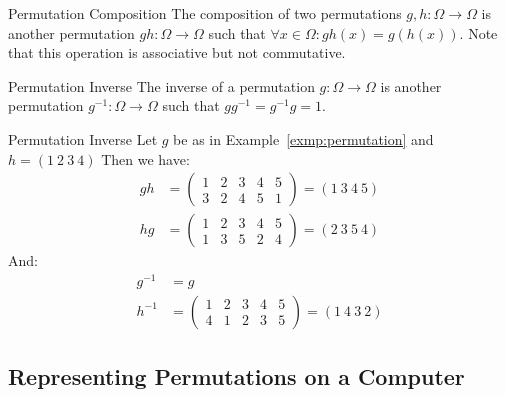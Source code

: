 \begin{defn}{Permutation Composition}
  The composition of two permutations $g, h: \Omega \rightarrow \Omega$ is
  another permutation $gh: \Omega \rightarrow \Omega$ such that $\forall x \in
  \Omega: gh(x) = g(h(x))$. Note that this operation is associative but not
  commutative.
\end{defn}

\begin{defn}[label=defn:permutation_inverse]{Permutation Inverse}
  The inverse of a permutation $g: \Omega \rightarrow \Omega$ is another
  permutation $g^{-1}: \Omega \rightarrow \Omega$ such that $gg^{-1} = g^{-1}g =
  1$.
\end{defn}

\begin{exmp}{Permutation Inverse}
  Let $g$ be as in Example~\ref{exmp:permutation} and $h = (1\ 2\ 3\ 4)$ Then
  we have:
  \begin{equation*}
    \begin{split}
      gh &= \begin{pmatrix} 1 & 2 & 3 & 4 & 5 \\ 3 & 2 & 4 & 5 & 1 \end{pmatrix}
        = (1\ 3\ 4\ 5) \\
      hg &= \begin{pmatrix} 1 & 2 & 3 & 4 & 5 \\ 1 & 3 & 5 & 2 & 4 \end{pmatrix}
        = (2\ 3\ 5\ 4)
    \end{split}
  \end{equation*}
  And:
  \begin{equation*}
    \begin{split}
      g^{-1} &= g \\
      h^{-1} &= \begin{pmatrix} 1 & 2 & 3 & 4 & 5 \\ 4 & 1 & 2 & 3 & 5 \end{pmatrix}
        = (1\ 4\ 3\ 2)
    \end{split}
  \end{equation*}
\end{exmp}

\subsection{Representing Permutations on a Computer}
\label{subsec:perm_representing_permutations_on_a_computer}

